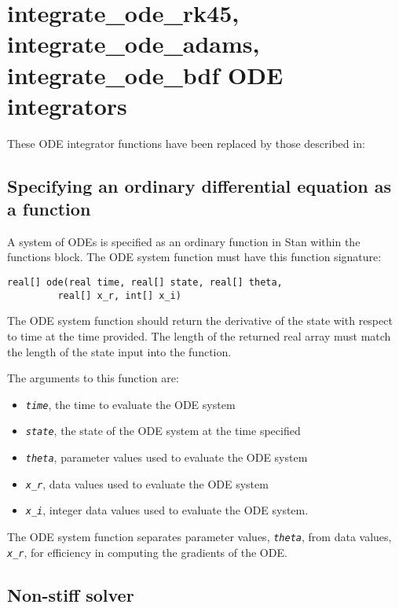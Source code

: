 \documentclass[
  10pt,
]{book}
\begin{document}
\hypertarget{functions-old-ode-solver}{%
\section{integrate\_ode\_rk45, integrate\_ode\_adams, integrate\_ode\_bdf ODE integrators}\label{functions-old-ode-solver}}

These ODE integrator functions have been replaced by those described in:

\hypertarget{specifying-an-ordinary-differential-equation-as-a-function}{%
\subsection{Specifying an ordinary differential equation as a function}\label{specifying-an-ordinary-differential-equation-as-a-function}}

A system of ODEs is specified as an ordinary function in Stan within
the functions block. The ODE system function must have this function
signature:

\begin{verbatim}
real[] ode(real time, real[] state, real[] theta,
         real[] x_r, int[] x_i)
\end{verbatim}

The ODE system function should return the derivative of the state with
respect to time at the time provided. The length of the returned real
array must match the length of the state input into the function.

The arguments to this function are:

\begin{itemize}
\item
  \emph{\texttt{time}}, the time to evaluate the ODE system
\item
  \emph{\texttt{state}}, the state of the ODE system at the time specified
\item
  \emph{\texttt{theta}}, parameter values used to evaluate the ODE system
\item
  \emph{\texttt{x\_r}}, data values used to evaluate the ODE system
\item
  \emph{\texttt{x\_i}}, integer data values used to evaluate the ODE system.
\end{itemize}

The ODE system function separates parameter values, \emph{\texttt{theta}}, from
data values, \emph{\texttt{x\_r}}, for efficiency in computing the gradients of the
ODE.

\hypertarget{non-stiff-solver-1}{%
\subsection{Non-stiff solver}\label{non-stiff-solver-1}}
\end{document}
